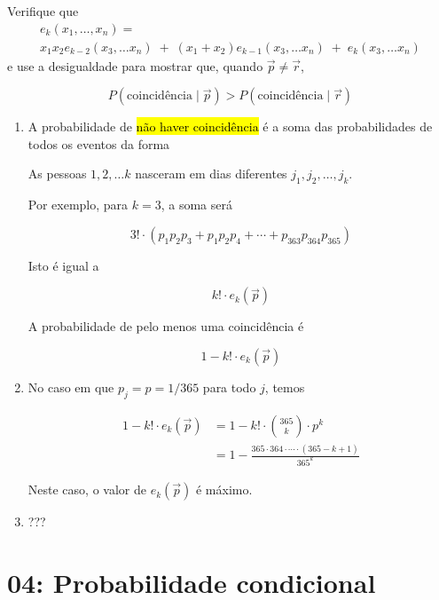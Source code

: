 \documentclass[
  11pt]{report}
\begin{document}
\begin{rmdbox}
\begin{enumerate}
  Verifique que
  \begin{multline*}
    e_k(x_1, \ldots, x_n) = \\
    x_1 x_2 e_{k-2}(x_3, \ldots x_n) \;+\;
    (x_1 + x_2) e_{k-1}(x_3, \ldots x_n) \;+\;
    e_{k}(x_3, \ldots x_n)
  \end{multline*}
  e use a desigualdade para mostrar que, quando $\vec p \neq \vec r$,

  \[
  P( \text{coincidência} \mid \vec p) 
  >
  P( \text{coincidência} \mid \vec r)
  \]
\end{enumerate}

\end{rmdbox}

\begin{enumerate}
\def\labelenumi{\alph{enumi}.}
\item
  A probabilidade de {\hl{não haver coincidência}} é a soma das probabilidades de todos os eventos da forma

  \begin{rmdbox}
  As pessoas $1, 2, \ldots k$ nasceram em dias diferentes $j_1, j_2, \ldots, j_k$.

  \end{rmdbox}

  Por exemplo, para $k = 3$, a soma será

  \[
  3! \cdot (p_1 p_2 p_3 + p_1 p_2 p_4 + \cdots + p_{363} p_{364} p_{365})
  \]

  Isto é igual a

  \[
  k! \cdot e_k(\vec p)
  \]

  A probabilidade de pelo menos uma coincidência é

  \[
  1 - k! \cdot e_k(\vec p)
  \]
\item
  No caso em que $p_j = p = 1/365$ para todo $j$, temos

  \[
  \begin{aligned}
    1 - k! \cdot e_k(\vec p) 
    &=
    1 - k! \cdot \binom{365}{k} \cdot p^k \\
    &=
    1 - \frac{365 \cdot 364 \cdot \cdots \cdot (365 - k + 1)}{365^k}
  \end{aligned}
  \]

  Neste caso, o valor de $e_k(\vec p)$ é máximo.
\item
  ???
\end{enumerate}

\hypertarget{probabilidade-condicional}{%
\chapter*{04: Probabilidade condicional}\label{probabilidade-condicional}}
\end{document}
